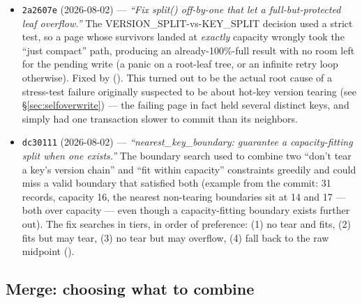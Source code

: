 \documentclass[11pt]{article}
\newcommand{\commit}[1]{\texttt{#1}}
\begin{document}
\begin{itemize}
  \item \commit{2a2607e} (2026-08-02) --- \emph{``Fix split() off-by-one that let a
        full-but-protected leaf overflow.''} The VERSION\_SPLIT-vs-KEY\_SPLIT decision
        used a strict  test, so a page whose survivors
        landed at \emph{exactly} capacity wrongly took the ``just compact'' path,
        producing an already-100\%-full result with no room left for the pending write
        (a panic on a root-leaf tree, or an infinite retry loop otherwise). Fixed by
         (). This turned out to be the
        actual root cause of a stress-test failure originally suspected to be about
        hot-key version tearing (see \S\ref{sec:selfoverwrite}) --- the failing page in
        fact held several distinct keys, and simply had one transaction slower to commit
        than its neighbors.
  \item \commit{dc30111} (2026-08-02) --- \emph{``nearest\_key\_boundary: guarantee a
        capacity-fitting split when one exists.''} The boundary search used to combine
        two ``don't tear a key's version chain'' and ``fit within capacity'' constraints
        greedily and could miss a valid boundary that satisfied both (example from the
        commit: 31 records, capacity 16, the nearest non-tearing boundaries sit at 14 and
        17 --- both over capacity --- even though a capacity-fitting boundary exists
        further out). The fix searches in tiers, in order of preference: (1) no tear and
        fits, (2) fits but may tear, (3) no tear but may overflow, (4) fall back to the
        raw midpoint ().
\end{itemize}

\subsection{Merge: choosing what to combine}
\end{document}
